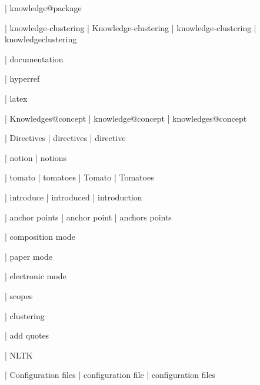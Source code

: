  | knowledge@package

 | knowledge-clustering
 | Knowledge-clustering
 | knowledge-cluste\-ring
 | knowledge\-clustering

 | documentation

 | hyperref

 | latex

 | Knowledges@concept
 | knowledge@concept
 | knowledges@concept

 | Directives
 | directives
 | directive

 | notion
 | notions

 | tomato
 | tomatoes
 | Tomato
 | Tomatoes

 | introduce
 | introduced
 | introduction

 | anchor points
 | anchor point
 | anchors points

 | composition mode

 | paper mode

 | electronic mode

 | scopes

 | clustering

 | add quotes

 | NLTK

 | Configuration files
 | configuration file
 | configuration files
